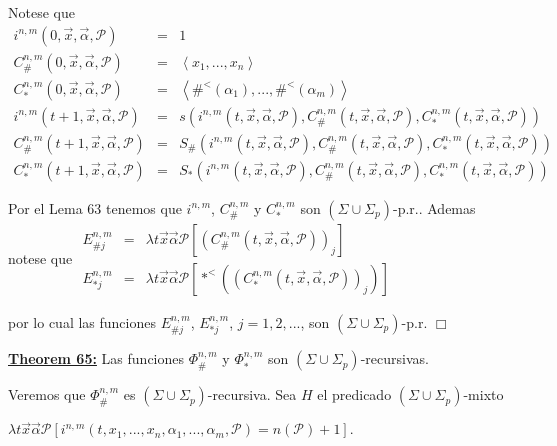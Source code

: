Notese que
\(\displaystyle \begin{array}{rcl} i^{n,m}(0,\vec{x},\vec{\alpha},\mathcal{P}) & =& 1 \\ C_{\#}^{n,m}(0,\vec{x},\vec{\alpha},\mathcal{P}) & =& \left\langle x_{1},...,x_{n}\right\rangle \\ C_{\ast }^{n,m}(0,\vec{x},\vec{\alpha},\mathcal{P}) & =& \left\langle \#^{< }(\alpha _{1}),...,\#^{< }(\alpha _{m})\right\rangle \\ i^{n,m}(t+1,\vec{x},\vec{\alpha},\mathcal{P}) & =& s(i^{n,m}(t,\vec{x},\vec{ \alpha},\mathcal{P}),C_{\#}^{n,m}(t,\vec{x},\vec{\alpha},\mathcal{P} ),C_{\ast }^{n,m}(t,\vec{x},\vec{\alpha},\mathcal{P})) \\ C_{\#}^{n,m}(t+1,\vec{x},\vec{\alpha},\mathcal{P}) & =& S_{\#}(i^{n,m}(t,\vec{x },\vec{\alpha},\mathcal{P}),C_{\#}^{n,m}(t,\vec{x},\vec{\alpha},\mathcal{P} ),C_{\ast }^{n,m}(t,\vec{x},\vec{\alpha},\mathcal{P})) \\ C_{\ast }^{n,m}(t+1,\vec{x},\vec{\alpha},\mathcal{P}) & =& S_{\ast }(i^{n,m}(t, \vec{x},\vec{\alpha},\mathcal{P}),C_{\#}^{n,m}(t,\vec{x},\vec{\alpha}, \mathcal{P}),C_{\ast }^{n,m}(t,\vec{x},\vec{\alpha},\mathcal{P})) \end{array} \)

Por el Lema 63 tenemos que \(i^{n,m}\), \( C_{\#}^{n,m}\) y \(C_{\ast }^{n,m}\) son \((\Sigma \cup \Sigma _{p})\)-p.r.. Ademas notese que
\(\displaystyle \begin{array}{rcl} E_{\#j}^{n,m} & =& \lambda t\vec{x}\vec{\alpha}\mathcal{P}\left[ (C_{\#}^{n,m}(t,\vec{x},\vec{\alpha},\mathcal{P}))_{j}\right] \\ E_{\ast j}^{n,m} & =& \lambda t\vec{x}\vec{\alpha}\mathcal{P}\left[ \ast ^{< }((C_{\ast }^{n,m}(t,\vec{x},\vec{\alpha},\mathcal{P}))_{j})\right] \end{array} \)

por lo cual las funciones \(E_{\#j}^{n,m}\), \(E_{\ast j}^{n,m}\), \(j=1,2,...\), son \((\Sigma \cup \Sigma _{p})\)-p.r. \(\Box\)


\textbf{\underline{Theorem 65:}} Las funciones \(\Phi _{\#}^{n,m}\) y \(\Phi _{\ast }^{n,m}\) son \((\Sigma \cup \Sigma _{p})\)-recursivas.

\PROOF Veremos que \(\Phi _{\#}^{n,m}\) es \((\Sigma \cup \Sigma _{p})\)-recursiva. Sea \(H\) el predicado \((\Sigma \cup \Sigma _{p})\)-mixto

\(\displaystyle \lambda t\vec{x}\vec{\alpha}\mathcal{P}\left[ i^{n,m}(t,x_{1},...,x_{n}, \alpha _{1},...,\alpha _{m},\mathcal{P})=n(\mathcal{P})+1\right] \text{.} \)

